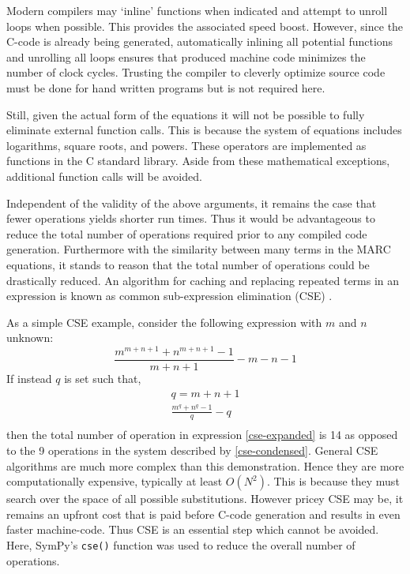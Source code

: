 \documentclass[preprint,12pt]{elsarticle}
\begin{document}
Modern compilers may `inline' functions when indicated and attempt 
to unroll loops when possible. This provides the associated speed boost.  However, 
since the C-code is already being generated, automatically inlining all potential
functions and unrolling all loops ensures that produced machine code 
minimizes the number of clock cycles.  Trusting the compiler to cleverly optimize
source code must be done for hand written programs but is not required here.

Still, given the actual form of the equations it will not be possible to fully 
eliminate external function calls.  This is because the system of equations includes 
logarithms, square roots, and powers.  These operators are implemented as functions 
in the C standard library.
Aside from these mathematical exceptions, additional function calls will
be avoided.

Independent of the validity of the above arguments, it remains the case that fewer 
operations yields
shorter run times.  Thus it would be advantageous to reduce the total number of 
operations required prior to any compiled code generation.  Furthermore with the
similarity between many terms in the MARC equations, it stands to reason that the
total number of operations could be drastically reduced.  An algorithm for 
caching and replacing repeated terms in an expression is known as common 
sub-expression elimination (CSE) \cite{Cocke:1970:GCS:390013.808480}.

As a simple CSE example, consider the following expression with $m$ and $n$ unknown:
\begin{equation}
\frac{m^{m+n+1} + n^{m+n+1} - 1}{m + n + 1} - m - n - 1
\label{cse-expanded}
\end{equation}
If instead $q$ is set such that,
\begin{equation}
\begin{array}{l}
q = m + n + 1\\
\frac{m^{q} + n^{q} - 1}{q} - q\\
\end{array}
\label{cse-condensed}
\end{equation}
then the total number of operation in expression \ref{cse-expanded} is 14 as
opposed to the 9 operations in the system described by \ref{cse-condensed}.
General CSE algorithms are much more complex than this demonstration.  Hence they are
more computationally expensive, typically at least $O(N^2)$.  This is because
they must search over the space of all possible substitutions.  However pricey
CSE may be, it remains an upfront cost that is paid before C-code generation and
results in even faster machine-code.  Thus CSE is an essential step which cannot be 
avoided.  Here, SymPy's \texttt{cse()} function was used to reduce the overall 
number of operations.
\end{document}
